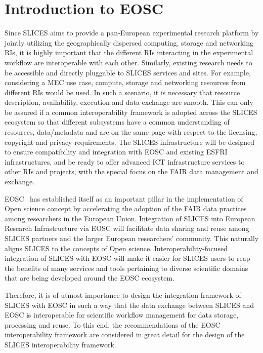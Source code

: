 \section{Introduction to EOSC}
\label{section:EOSC}



Since SLICES aims to provide a pan-European experimental research platform by jointly utilizing the geographically dispersed computing, storage and networking RIs, it is highly important that the different RIs interacting in the experimental workflow are interoperable with each other. Similarly, existing research needs to be accessible and directly pluggable to SLICES services and sites. For example, considering a MEC use case, compute, storage and networking resources from different RIs would be used. In such a scenario, it is necessary that resource description, availability, execution and data exchange are smooth. This can only be assured if a common interoperability framework is adopted across the SLICES ecosystem so that different subsystems have a common understanding of resources, data/metadata and are on the same page with respect to the licensing, copyright and privacy requirements.  The SLICES infrastructure will be designed to ensure compatibility and integration with EOSC and existing ESFRI infrastructures, and be ready to offer advanced ICT infrastructure services to other RIs and projects, with the special focus on the FAIR data management and exchange. 

EOSC~\cite{eosc} has established itself as an important pillar in the implementation of Open science concept by accelerating the adoption of the FAIR data practices among researchers in the European Union. Integration of SLICES into European Research Infrastructure via EOSC will facilitate data sharing and reuse among SLICES partners and the larger European researchers’ community. This naturally aligns SLICES to the concepts of Open science. Interoperability-focused integration of SLICES with EOSC will make it easier for SLICES users to reap the benefits of many services and tools pertaining to diverse scientific domains that are being developed around the EOSC ecosystem. 

Therefore, it is of utmost importance to design the integration framework of SLICES with EOSC in such a way that the data exchange between SLICES and EOSC is interoperable for scientific workflow management for data storage, processing and reuse. To this end, the recommendations of the EOSC interoperability framework  are considered in great detail for the design of the  SLICES interoperability framework.

